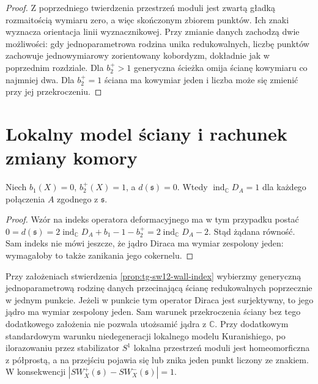 \begin{proof}
Z poprzedniego twierdzenia przestrzeń moduli jest
zwartą gładką rozmaitością wymiaru zero, a więc
skończonym zbiorem punktów. Ich znaki wyznacza
orientacja linii wyznacznikowej. Przy zmianie danych
zachodzą dwie możliwości: gdy jednoparametrowa rodzina
unika redukowalnych, liczbę punktów zachowuje
jednowymiarowy zorientowany kobordyzm, dokładnie jak
w poprzednim rozdziale. Dla $b_2^+>1$ generyczna
ścieżka omija ścianę kowymiaru co najmniej dwa.
Dla $b_2^+=1$ ściana ma kowymiar jeden i
liczba może się zmienić przy jej przekroczeniu.
\end{proof}

\section{Lokalny model ściany i rachunek zmiany komory}
\label{sec:tg-sw12-wall}

\begin{stwierdzenie}
\label{prop:tg-sw12-wall-index}
Niech $b_1(X)=0$, $b_2^+(X)=1$, a
$d(\mathfrak s)=0$. Wtedy
$\operatorname{ind}_\mathbb C D_A=1$
dla każdego połączenia $A$ zgodnego z $\mathfrak s$.
\end{stwierdzenie}

\begin{proof}
Wzór na indeks operatora deformacyjnego ma w tym
przypadku postać
$0=d(\mathfrak s)=2\operatorname{ind}_\mathbb C D_A
+b_1-1-b_2^+=2\operatorname{ind}_\mathbb C D_A-2$.
Stąd żądana równość. Sam indeks nie mówi jeszcze,
że jądro Diraca ma wymiar zespolony jeden: wymagałoby
to także zanikania jego cokernelu.
\end{proof}

\begin{twierdzenie}
\label{thm:tg-sw12-wall-model}
Przy założeniach stwierdzenia
\ref{prop:tg-sw12-wall-index} wybierzmy generyczną
jednoparametrową rodzinę danych przecinającą ścianę
redukowalnych poprzecznie w jednym punkcie. Jeżeli
w punkcie tym operator Diraca jest surjektywny, to
jego jądro ma wymiar zespolony jeden. Sam warunek
przekroczenia ściany bez tego dodatkowego założenia
nie pozwala utożsamić jądra z $\mathbb C$. Przy dodatkowym
standardowym warunku niedegeneracji lokalnego modelu
Kuranishiego, po ilorazowaniu przez stabilizator $S^1$
lokalna przestrzeń moduli jest homeomorficzna z półprostą,
a na przejściu pojawia się lub znika jeden punkt
liczony ze znakiem. W konsekwencji
$|SW_X^+(\mathfrak s)-SW_X^-(\mathfrak s)|=1$.
\end{twierdzenie}

